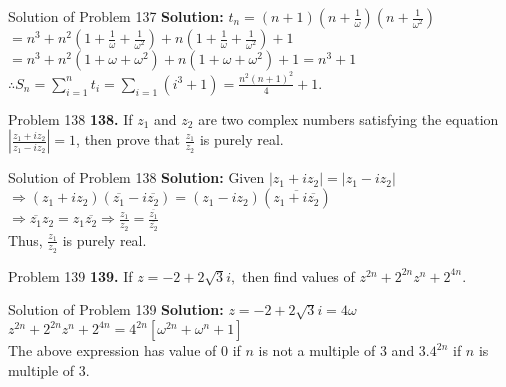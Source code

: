\documentclass[aspectratio=169,8pt]{beamer}
\begin{document}
\begin{frame}{Solution of Problem 137}
  \textbf{Solution:} $t_n = (n + 1)\left(n + \frac{1}{\omega}\right)\left(n + \frac{1}{\omega^2}\right)$\\
  \vspace*{0.2cm}
  $= n^3 + n^2\left(1 + \frac{1}{\omega} + \frac{1}{\omega^2}\right) + n\left(1 + \frac{1}{\omega} + \frac{1}{\omega^2}\right) +
  1$\\
  \vspace*{0.2cm}
  $= n^3 + n^2(1 + \omega + \omega^2) + n(1 + \omega + \omega^2) + 1 = n^3 + 1$\\
  \vspace*{0.2cm}
  $\therefore S_n = \sum_{i = 1}^nt_i = \sum_{i = 1}(i^3 + 1) = \frac{n^2(n + 1)^2}{4} + 1$.
\end{frame}
\begin{frame}{Problem 138}
  \textbf{138.} If $z_1$ and $z_2$ are two complex numbers satisfying the equation $\left|\frac{z_1 + iz_2}{z_1 -
    iz_2}\right| = 1$, then prove that $\frac{z_1}{z_2}$ is purely real.
\end{frame}
\begin{frame}{Solution of Problem 138}
  \textbf{Solution:} Given $|z_1 + iz_2| = |z_1 - iz_2|$\\
  \vspace*{0.2cm}
  $\Rightarrow (z_1 + iz_2)(\overline{z_1} - i\overline{z_2}) = (z_1 - iz_2)(\overline{z_1 + i\overline{z_2}})$\\
  \vspace*{0.2cm}
  $\Rightarrow \overline{z_1}z_2 = z_1\overline{z_2} \Rightarrow \frac{z_1}{z_2} = \frac{\overline{z_1}}{\overline{z_2}}$\\
  \vspace*{0.2cm}
  Thus, $\frac{z_1}{z_2}$ is purely real.
\end{frame}
\begin{frame}{Problem 139}
  \textbf{139.} If $z = -2 + 2\sqrt{3}i,$ then find values of $z^{2n} + 2^{2n}z^n + 2^{4n}$.
\end{frame}
\begin{frame}{Solution of Problem 139}
  \textbf{Solution:} $z = -2 + 2\sqrt{3}i = 4\omega$\\
  \vspace*{0.2cm}
  $z^{2n} + 2^{2n}z^n + 2^{4n} = 4^{2n}[\omega^{2n} + \omega^n + 1]$\\
  \vspace*{0.2cm}
  The above expression has value of $0$ if $n$ is not a multiple of $3$ and $3.4^{2n}$ if $n$ is multiple of $3$.
\end{frame}
\end{document}
